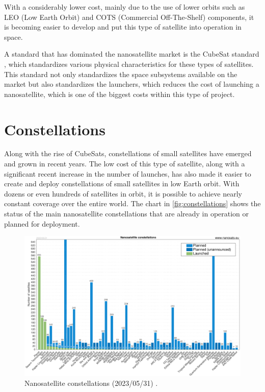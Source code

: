 With a considerably lower cost, mainly due to the use of lower orbits such as LEO (Low Earth Orbit) and COTS (Commercial Off-The-Shelf) components, it is becoming easier to develop and put this type of satellite into operation in space.

A standard that has dominated the nanosatellite market is the CubeSat standard \cite{cds}, which standardizes various physical characteristics for these types of satellites. This standard not only standardizes the space subsystems available on the market but also standardizes the launchers, which reduces the cost of launching a nanosatellite, which is one of the biggest costs within this type of project.

\section{Constellations}

Along with the rise of CubeSats, constellations of small satellites have emerged and grown in recent years. The low cost of this type of satellite, along with a significant recent increase in the number of launches, has also made it easier to create and deploy constellations of small satellites in low Earth orbit. With dozens or even hundreds of satellites in orbit, it is possible to achieve nearly constant coverage over the entire world. The chart in \autoref{fig:constellations} shows the status of the main nanosatellite constellations that are already in operation or planned for deployment.

\begin{figure}[!ht]
    \begin{center}
        \includegraphics[width=\columnwidth]{figures/Nanosats_constellations_2023-05-31}
        \caption{Nanosatellite constellations (2023/05/31) \cite{nanosatseu}.}
        \label{fig:constellations}
    \end{center}
\end{figure}


